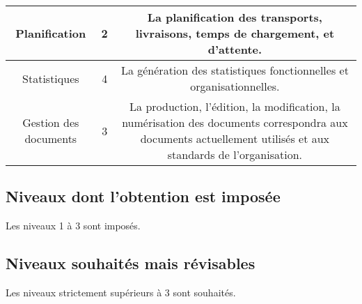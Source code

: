 \begin{tabular}{|c|c|c|}
\\\hline
Planification & 2 & La planification des transports, livraisons, temps de chargement, et d'attente.
\\\hline
Statistiques & 4 & La génération des statistiques fonctionnelles et organisationnelles.
\\\hline
Gestion des documents & 3 & La production, l'édition, la modification, la numérisation des documents correspondra aux documents actuellement utilisés et aux standards de l'organisation.
\\\hline
\end{tabular}

\subsection{Niveaux dont l'obtention est imposée}
Les niveaux 1 à 3 sont imposés.

\subsection{Niveaux souhaités mais révisables}
Les niveaux strictement supérieurs à 3 sont souhaités.
